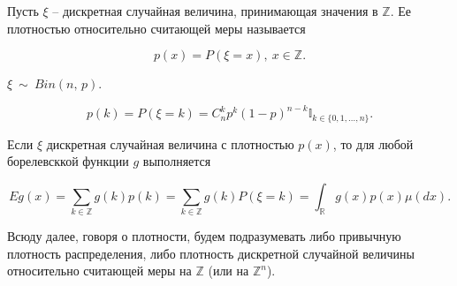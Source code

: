 \newcommand{\nequiv}{\not\equiv}

\begin{definition}
Пусть $\displaystyle \xi $ -- дискретная случайная величина, принимающая значения в $\displaystyle \mathbb{Z}$. Ее плотностью относительно считающей меры называется

\begin{equation*}
p( x) =P( \xi =x) ,\ x\in \mathbb{Z} .
\end{equation*}
\end{definition}
\begin{example}
$\displaystyle \xi \ \sim \ Bin(n,\, p)$.


\begin{equation*}
p( k) =P( \xi =k) =C_{n}^{k} p^{k}( 1-p)^{n-k}\mathbb{I}_{k\in \{0,1,\dotsc ,n\}} .
\end{equation*}
\end{example}
Если $\displaystyle \xi $ дискретная случайная величина с плотностью $\displaystyle p( x)$, то для любой борелевсккой функции $\displaystyle g$ выполняется


\begin{equation*}
Eg( x) =\sum _{k\in \mathbb{Z}} g( k) p( k) =\sum _{k\in \mathbb{Z}} g( k) P( \xi =k) =\int _{\mathbb{R}} g( x) p( x) \mu ( dx) .
\end{equation*}
\begin{note}
Всюду далее, говоря о плотности, будем подразумевать либо привычную плотность распределения, либо плотность дискретной случайной величины относительно считающей меры на $\displaystyle \mathbb{Z}$ (или на $\displaystyle \mathbb{Z}^{n}$).
\end{note}

